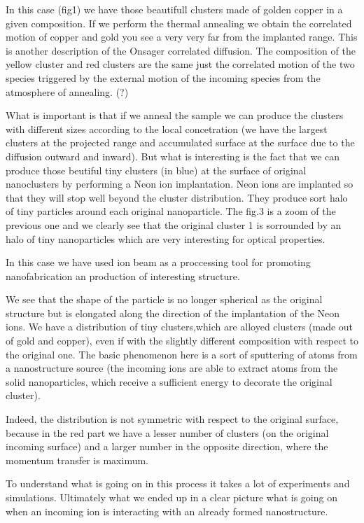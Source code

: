 \documentclass[../main/main.tex]{subfiles}
\begin{document}
In this case (fig1) we have those beautifull clusters made of golden copper in a given composition. If we perform the thermal annealing we obtain the correlated motion of copper and gold you see a very very far from the implanted range.
This is another description of the Onsager correlated diffusion. The composition of the yellow cluster and red clusters are the same just the correlated motion of the two species triggered by the external motion of the incoming species from the atmosphere of annealing. (?)

What is important is that if we anneal the sample we can produce the clusters with different sizes according to the local concetration (we have the largest clusters at the projected range and accumulated surface at the surface due to the diffusion outward and inward). But what is interesting is the fact that we can produce those beutiful tiny clusters (in blue) at the surface of original nanoclusters by performing a Neon ion implantation. Neon ions are implanted so that they will stop well beyond the cluster distribution. They produce sort halo of tiny particles around each original nanoparticle.
The fig.3 is a zoom of the previous one and we clearly see that the original cluster 1 is sorrounded by an halo of tiny nanoparticles which are very interesting for optical properties.

In this case we have used ion beam as a proccessing tool for promoting nanofabrication an production of interesting structure.

We see that the shape of the particle is no longer spherical as the original structure but is elongated along the direction of the implantation of the Neon ions.
We have a distribution of tiny clusters,which are alloyed clusters (made out of gold and copper), even if with the slightly different composition with respect to the original one.
The basic phenomenon here is a sort of sputtering of atoms from a nanostructure source (the incoming ions are able to extract atoms from the solid nanoparticles, which receive a sufficient energy to decorate the original cluster).

Indeed, the distribution is not symmetric with respect to the original surface, because in the red part we have a lesser number of clusters (on the original incoming surface) and a larger number in the opposite direction, where the momentum transfer is maximum.

To understand what is going on in this process it takes a lot of experiments and simulations.
Ultimately what we ended up in a clear picture what is going on when an incoming ion is interacting with an already formed nanostructure.
\end{document}
